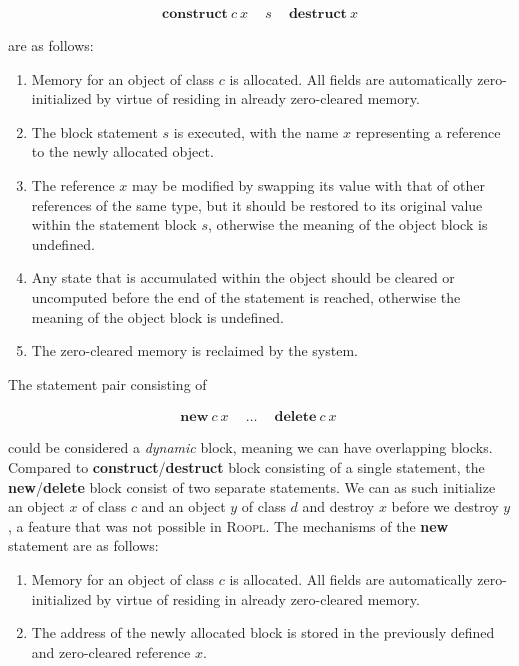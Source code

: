 \begin{align*}
\textbf{construct}\ c\ x\ \quad s\ \quad \textbf{destruct}\ x
\end{align*}

are as follows:

\begin{enumerate}
\item Memory for an object of class $c$ is allocated. All fields are automatically zero-initialized by virtue of residing in already zero-cleared memory.
\item The block statement $s$ is executed, with the name $x$ representing a reference to the newly allocated object.
\item The reference $x$ may be modified by swapping its value with that of other references of the same type, but it should be restored to its original value within the statement block $s$, otherwise the meaning of the object block is undefined.
\item Any state that is accumulated within the object should be cleared or uncomputed before the end of the statement is reached, otherwise the meaning of the object block is undefined.
\item The zero-cleared memory is reclaimed by the system.
\end{enumerate}

The statement pair consisting of

\begin{align*}
\textbf{new}\ c\ x\ \quad \dots\ \quad \textbf{delete}\ c\ x\
\end{align*}

could be considered a \textit{dynamic} block, meaning we can have overlapping blocks. Compared to \textbf{construct}/\textbf{destruct} block consisting of a single statement, the \textbf{new}/\textbf{delete} block consist of two separate statements. We can as such initialize an object $x$ of class $c$ and an object $y$ of class $d$ and destroy $x$ before we destroy $y$, a feature that was not possible in \textsc{Roopl}. The mechanisms of the \textbf{new} statement are as follows:

\begin{enumerate}
    \item Memory for an object of class $c$ is allocated. All fields are automatically zero-initialized by virtue of residing in already zero-cleared memory.
    \item The address of the newly allocated block is stored in the previously defined and zero-cleared reference $x$.
\end{enumerate}

